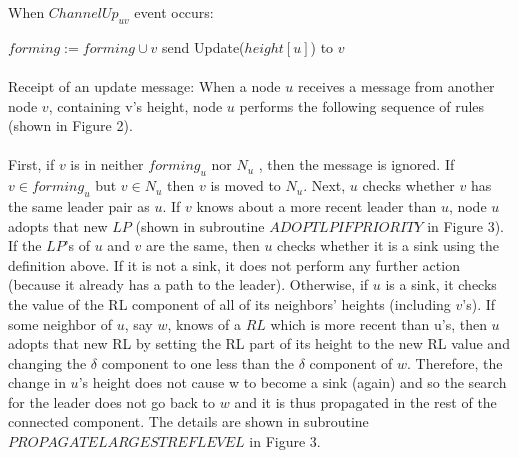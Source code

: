 \begin{algorithm}
	\caption{When $ChannelUp_{uv}$ event occurs:}
	\begin{algorithmic}[1]
		
	\State $forming := forming \cup {v}$
	\State send Update($height[u]$) to $v$
		
	\end{algorithmic}
\end{algorithm}

\paragraph{}Receipt of an update message: When a node $u$ receives a message from another node $v$, containing v’s height, node $u$ performs the following sequence of rules (shown in Figure 2).
\paragraph{}First, if $v$ is in neither $forming_u$ nor $N_u$ , then the message is ignored. If $v \in forming_u$ but $v \in N_u$ then $v$ is moved to $N_u$. Next, $u$ checks whether $v$ has the same leader pair as $u$. If $v$ knows about a more recent leader than $u$, node $u$ adopts that new $LP$ (shown in subroutine $ADOPTLPIFPRIORITY$ in Figure 3). If the $LP$’s of $u$ and $v$ are the same, then $u$ checks whether it is a sink using the definition above. If it is not a sink, it does not perform any further action (because it already has a path to the leader). Otherwise, if $u$ is a sink, it checks the value of the RL component of all of its neighbors’ heights (including $v$’s). If some neighbor of $u$, say $w$, knows of a $RL$ which is more recent than u’s, then $u$ adopts that new RL by setting the RL part of its height to the new RL value and changing the $\delta$ component to one less than the $\delta$ component of $w$. Therefore, the change in $u$’s height does not cause w to become a sink (again) and so the search for the leader does not go back to $w$ and it is thus propagated in the rest of the connected component. The details are shown in subroutine $PROPAGATELARGESTREFLEVEL$ in Figure 3.
